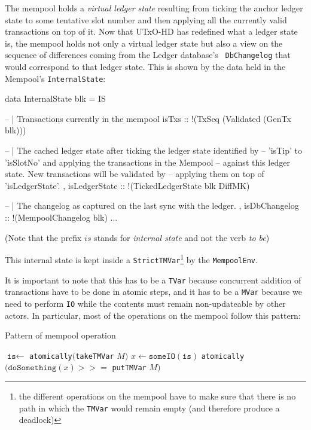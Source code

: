 \documentclass[11pt,a4paper]{article}
\newcommand{\htt}[1]{\texttt{#1}}
\theoremstyle{definition}
\let\getss\gets
\renewcommand*{\gets}{\coloneqq}
\begin{document}
The mempool holds a \emph{virtual ledger state} resulting from ticking the
anchor ledger state to some tentative slot number and then applying all the
currently valid transactions on top of it. Now that UTxO-HD has redefined what a
ledger state is, the mempool holds not only a virtual ledger state but also a
view on the sequence of differences coming from the Ledger database's {\tt
  DbChangelog} that would correspond to that ledger state. This is shown by the
data held in the Mempool's \htt{InternalState}:

\begin{code}
data InternalState blk = IS {
   -- | Transactions currently in the mempool
   isTxs          :: !(TxSeq (Validated (GenTx blk)))

   -- | The cached ledger state after ticking the ledger state identified by
   -- 'isTip' to 'isSlotNo' and applying the transactions in the Mempool
   -- against this ledger state. New transactions will be validated by
   -- applying them on top of 'isLedgerState'.
 , isLedgerState  :: !(TickedLedgerState blk DiffMK)

   -- | The changelog as captured on the last sync with the ledger.
 , isDbChangelog  :: !(MempoolChangelog blk)
   ...
}
\end{code}

(Note that the prefix $is$ stands for \emph{internal state} and not the verb \emph{to be})

This internal state is kept inside a \htt{StrictTMVar}\footnote{the different operations on the mempool have to make
sure that there is no path in which the \htt{TMVar} would remain empty (and
therefore produce a deadlock)} by the
\htt{MempoolEnv}.

It is important to note that this has to be a \htt{TVar} because concurrent
addition of transactions have to be done in atomic steps, and it has to be a
\htt{MVar} because we need to perform \htt{IO} while the contents must
remain non-updateable by other actors. In particular, most of the operations on
the mempool follow this pattern:

\begin{algorithm}
  \caption{Pattern of mempool operation}
  \begin{algorithmic}[1]
    \Procedure{MempoolOp}{$M :: $ \htt{Mempool}}
    \State $\texttt{is} \getss$ \htt{atomically}$($\htt{takeTMVar} $M)$
    \State $x \getss \texttt{someIO}(\texttt{is})$
    \State \htt{atomically}$(\texttt{doSomething}(x) >>=$ \htt{putTMVar} $M)$
    \EndProcedure
 \end{algorithmic}
\end{algorithm}
\end{document}
